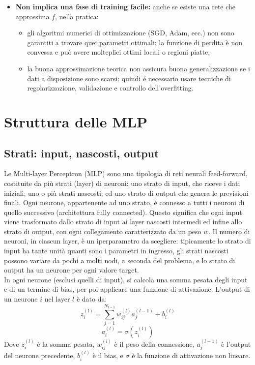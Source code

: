 \documentclass[a4paper,12pt]{report}
\begin{document}
\begin{itemize}
		\item \textbf{Non implica una fase di training facile:} anche se esiste una rete che approssima \(f\), nella pratica:
		\begin{itemize}
			\item gli algoritmi numerici di ottimizzazione (SGD, Adam, ecc.) non sono garantiti a trovare quei parametri ottimali: la funzione di perdita è non convessa e può avere molteplici ottimi locali o regioni piatte;
			\item la buona approssimazione teorica non assicura buona generalizzazione se i dati a disposizione sono scarsi: quindi é necessario usare tecniche di regolarizzazione, validazione e controllo dell'overfitting.
		\end{itemize}
	\end{itemize}
	
	\section{Struttura delle MLP}
	
	\subsection{Strati: input, nascosti, output}
	Le Multi-layer Perceptron (MLP) sono una tipologia di reti neurali feed-forward, costituite da più strati (layer) di neuroni: uno strato di input, che riceve i dati iniziali; uno o più strati nascosti; ed uno strato di output che genera le previsioni finali. Ogni neurone, appartenente ad uno strato, è connesso a tutti i neuroni di quello successivo (architettura fully connected). Questo significa che ogni input viene trasformato dallo strato di input ai layer nascosti intermedi ed infine allo strato di output, con ogni collegamento caratterizzato da un peso $w$. Il numero di neuroni, in ciascun layer, è un iperparametro da scegliere: tipicamente lo strato di input ha tante unità quanti sono i parametri in ingresso, gli strati nascosti possono variare da pochi a molti nodi, a seconda del problema, e lo strato di output ha un neurone per ogni valore target. \\
	In ogni neurone (esclusi quelli di input), si calcola una somma pesata degli input e di un termine di bias, per poi applicare una funzione di attivazione. L'output di un neurone $i$ nel layer $l$ è dato da:
	$$z_i^{(l)} = \sum_{j=1}^{N_{l-1}} w_{ij}^{(l)} a_j^{(l-1)} + b_i^{(l)}$$
	$$a_i^{(l)} = \sigma(z_i^{(l)})$$
	Dove $z_i^{(l)}$ è la somma pesata, $w_{ij}^{(l)}$ è il peso della connessione, $a_j^{(l-1)}$ è l'output del neurone precedente, $b_i^{(l)}$ è il bias, e $\sigma$ è la funzione di attivazione non lineare.
	
\end{document}
